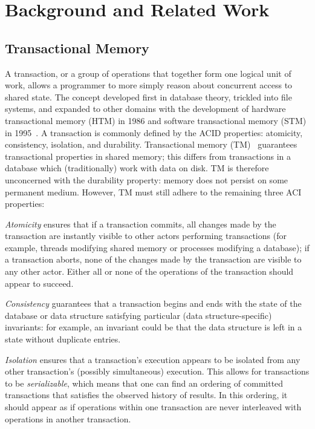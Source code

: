 \chapter{Background and Related Work}
\label{related_work}

\section{Transactional Memory}
A transaction, or a group of operations that together form one logical unit of work, allows a programmer to more simply reason about concurrent access to shared state. The concept developed first in database theory, trickled into file systems, and expanded to other domains with the development of hardware transactional memory (HTM) in 1986 and software transactional memory (STM) in 1995~\cite{harristm}. 
A transaction is commonly defined by the ACID properties: atomicity, consistency, isolation, and durability. Transactional memory (TM)~\cite{harristm, herlihytm} guarantees transactional properties in shared memory; this differs from transactions in a database which (traditionally) work with data on disk.
TM is therefore unconcerned with the durability property: memory does not persist on some permanent medium. However, TM must still adhere to the remaining three ACI properties:

\emph{Atomicity} ensures that if a transaction commits, all changes made by the transaction are instantly visible to other actors performing transactions (for example, threads modifying shared memory or processes modifying a database); if a transaction aborts, none of the changes made by the transaction are visible to any other actor. Either all or none of the operations of the transaction should appear to succeed.

\emph{Consistency} guarantees that a transaction begins and ends with the state of the database or data structure satisfying particular (data structure-specific) invariants: for example, an invariant could be that the data structure is left in a state without duplicate entries.

\emph{Isolation} ensures that a transaction's execution appears to be isolated from any other transaction's (possibly simultaneous) execution. This allows for transactions to be \emph{serializable}, which means that one can find an ordering of committed transactions that satisfies the observed history of results. In this ordering, it should appear as if operations within one transaction are never interleaved with operations in another transaction. 

